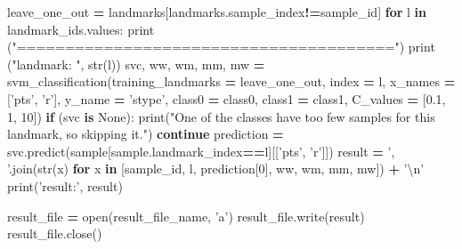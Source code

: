 \documentclass[10pt,letterpaper]{article}
\newenvironment{Shaded}{\begin{snugshade}}{\end{snugshade}}
\newcommand{\KeywordTok}[1]{\textcolor[rgb]{0.13,0.29,0.53}{\textbf{#1}}}
\newcommand{\DecValTok}[1]{\textcolor[rgb]{0.00,0.00,0.81}{#1}}
\newcommand{\FloatTok}[1]{\textcolor[rgb]{0.00,0.00,0.81}{#1}}
\newcommand{\CharTok}[1]{\textcolor[rgb]{0.31,0.60,0.02}{#1}}
\newcommand{\StringTok}[1]{\textcolor[rgb]{0.31,0.60,0.02}{#1}}
\newcommand{\VariableTok}[1]{\textcolor[rgb]{0.00,0.00,0.00}{#1}}
\newcommand{\ControlFlowTok}[1]{\textcolor[rgb]{0.13,0.29,0.53}{\textbf{#1}}}
\newcommand{\OperatorTok}[1]{\textcolor[rgb]{0.81,0.36,0.00}{\textbf{#1}}}
\newcommand{\BuiltInTok}[1]{#1}
\newcommand{\NormalTok}[1]{#1}
\begin{document}
\begin{Shaded}
\begin{Highlighting}[]
\NormalTok{    leave_one_out }\OperatorTok{=}\NormalTok{ landmarks[landmarks.sample_index}\OperatorTok{!=}\NormalTok{sample_id]}
    \ControlFlowTok{for}\NormalTok{ l }\KeywordTok{in}\NormalTok{ landmark_ids.values:}
        \BuiltInTok{print}\NormalTok{ (}\StringTok{"======================================="}\NormalTok{)}
        \BuiltInTok{print}\NormalTok{ (}\StringTok{"landmark: "}\NormalTok{, }\BuiltInTok{str}\NormalTok{(l))}
\NormalTok{        svc, ww, wm, mm, mw }\OperatorTok{=}\NormalTok{ svm_classification(training_landmarks }\OperatorTok{=}\NormalTok{ leave_one_out,}
\NormalTok{                                                 index }\OperatorTok{=}\NormalTok{ l,}
\NormalTok{                                                 x_names }\OperatorTok{=}\NormalTok{ [}\StringTok{'pts'}\NormalTok{, }\StringTok{'r'}\NormalTok{],}
\NormalTok{                                                 y_name }\OperatorTok{=} \StringTok{'stype'}\NormalTok{,}
\NormalTok{                                                 class0 }\OperatorTok{=}\NormalTok{ class0,}
\NormalTok{                                                 class1 }\OperatorTok{=}\NormalTok{ class1,}
\NormalTok{                                                 C_values }\OperatorTok{=}\NormalTok{ [}\FloatTok{0.1}\NormalTok{, }\DecValTok{1}\NormalTok{, }\DecValTok{10}\NormalTok{])}
        \ControlFlowTok{if}\NormalTok{ (svc }\KeywordTok{is} \VariableTok{None}\NormalTok{):}
            \BuiltInTok{print}\NormalTok{(}\StringTok{"One of the classes have too few samples for this landmark, so skipping it."}\NormalTok{)}
            \ControlFlowTok{continue}
\NormalTok{        prediction }\OperatorTok{=}\NormalTok{ svc.predict(sample[sample.landmark_index}\OperatorTok{==}\NormalTok{l][[}\StringTok{'pts'}\NormalTok{, }\StringTok{'r'}\NormalTok{]])}
\NormalTok{        result }\OperatorTok{=} \StringTok{', '}\NormalTok{.join(}\BuiltInTok{str}\NormalTok{(x) }\ControlFlowTok{for}\NormalTok{ x }\KeywordTok{in}\NormalTok{ [sample_id, l, prediction[}\DecValTok{0}\NormalTok{], ww, wm, mm, mw]) }\OperatorTok{+} \StringTok{'}\CharTok{\textbackslash{}n}\StringTok{'}
        \BuiltInTok{print}\NormalTok{(}\StringTok{'result:'}\NormalTok{, result)}

\NormalTok{        result_file }\OperatorTok{=} \BuiltInTok{open}\NormalTok{(result_file_name, }\StringTok{'a'}\NormalTok{)}
\NormalTok{        result_file.write(result)}
\NormalTok{        result_file.close()}
\end{Highlighting}
\end{Shaded}
\end{document}
